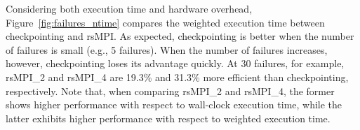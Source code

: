 Considering both execution time and hardware overhead, Figure~\ref{fig:failures_ntime} compares the weighted execution time between checkpointing and rsMPI.  As expected, checkpointing is better when the number of  failures is small (e.g., 5 failures).  When the number of failures increases,  however, checkpointing loses its advantage quickly. At 30 failures, for example, rsMPI\_2 and rsMPI\_4 are 19.3\% and 31.3\% more efficient than  checkpointing, respectively.
Note that, when comparing rsMPI\_2 and rsMPI\_4, the former shows higher performance with respect to wall-clock execution time, while the latter exhibits higher performance with respect to weighted execution time. 
